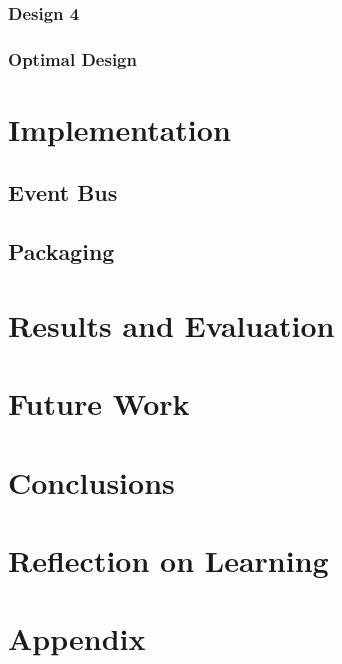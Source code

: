 \documentclass[12pt, conference, final, a4paper, onecolumn, compsoc]{IEEEtran}
\begin{document}
    \subsubsection*{Design 4}
    \paragraph{}

    \subsubsection*{Optimal Design}
    \paragraph{}

    \section{Implementation}
    \subsection*{Event Bus}

    \subsection*{Packaging}

    \section{Results and Evaluation}
    \subsection*{}

    \section{Future Work}
    \subsection*{}

    \section{Conclusions}
    \subsection*{}

    \section{Reflection on Learning}
    \subsection*{}

    \section{Appendix}
     

  
\end{document}
